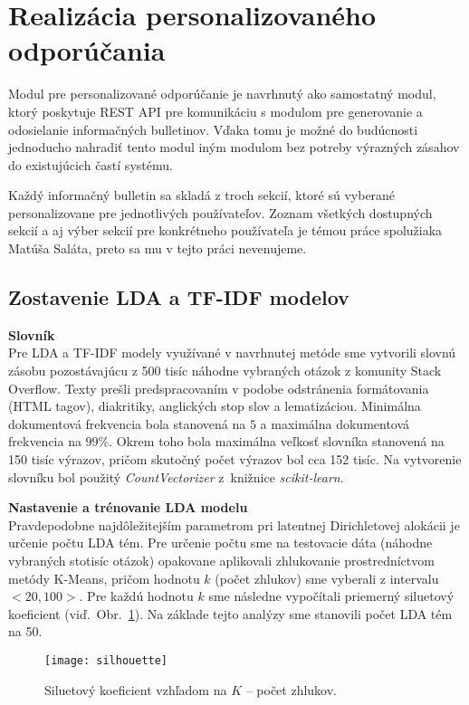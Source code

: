 \section{Realizácia personalizovaného odporúčania}
\label{impl:rec}

Modul pre personalizované odporúčanie je navrhnutý ako samostatný modul, ktorý poskytuje REST API pre komunikáciu
s modulom pre generovanie a odosielanie informačných bulletinov. Vďaka tomu je možné do budúcnosti jednoducho nahradiť
tento modul iným modulom bez potreby výrazných zásahov do existujúcich častí systému.

Každý informačný bulletin sa skladá z troch sekcií, ktoré sú vyberané personalizovane pre jednotlivých používateľov.
Zoznam všetkých dostupných sekcií a aj výber sekcií pre konkrétneho používateľa je témou práce spolužiaka Matúša Saláta\cite{Salat2018},
preto sa mu v tejto práci nevenujeme.

\subsection{Zostavenie LDA a TF-IDF modelov}

\textbf{Slovník}\\
Pre LDA a TF-IDF modely využívané v navrhnutej metóde sme vytvorili slovnú zásobu pozostávajúcu z 500 tisíc náhodne vybraných
otázok z komunity Stack Overflow. Texty prešli predspracovaním v podobe odstránenia formátovania (HTML tagov), diakritiky,
anglických stop slov a lematizáciou. Minimálna dokumentová frekvencia bola stanovená na $5$ a maximálna dokumentová frekvencia na $99\%$.
Okrem toho bola maximálna veľkosť slovníka stanovená na 150 tisíc výrazov, pričom skutočný počet výrazov bol cca 152 tisíc.
Na vytvorenie slovníku bol použitý \textit{CountVectorizer} z~knižnice \textit{scikit-learn}.

\textbf{Nastavenie a trénovanie LDA modelu}\\
Pravdepodobne najdôležitejším parametrom pri latentnej Dirichletovej alokácii je určenie počtu LDA tém. Pre určenie počtu sme
na testovacie dáta (náhodne vybraných stotisíc otázok) opakovane aplikovali zhlukovanie prostredníctvom metódy K-Means, pričom
hodnotu $k$ (počet zhlukov) sme vyberali z intervalu $<20,100>$. Pre každú hodnotu $k$ sme následne vypočítali priemerný siluetový koeficient
(viď.~Obr.~\ref{fig:silhouette}). Na základe tejto analýzy sme stanovili počet LDA tém na 50.

\begin{figure}[H]\begin{center}
\texttt{[image: silhouette]}
\caption{Siluetový koeficient vzhľadom na $K$ -- počet zhlukov. \label{fig:silhouette}}\end{center}
\end{figure}

